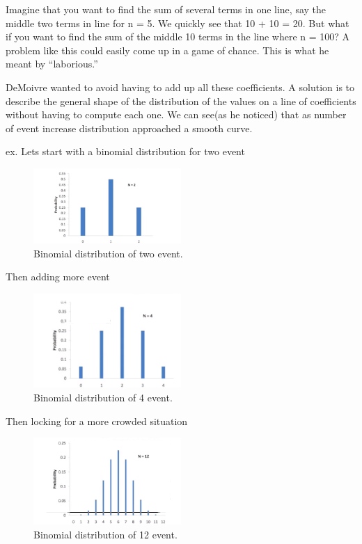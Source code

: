 \documentclass{article}
\begin{document}
Imagine that you want to find the sum of
several terms in one line, say the middle two
terms in line for n = 5.
We quickly see that 10 + 10 = 20.
But what if you want to find the sum of the middle
10 terms in the line where n = 100? A problem like
this could easily come up in a game of chance. This
is what he meant by “laborious.”

DeMoivre wanted to avoid having to add up all these coefficients. A solution is to describe the general shape of the distribution of the values on a line of coefficients without having to compute each one. We
can see(as he noticed) that as number of event increase distribution approached a smooth curve.

ex. Lets start with a binomial distribution for two event
\begin{figure}[H]
\centering
\includegraphics[width=0.5\textwidth]{images/0.png}
\caption{\label{fig:bin2}Binomial distribution of two event.}
\end{figure}

Then adding more event

\begin{figure}[H]
\centering
\includegraphics[width=0.5\textwidth]{images/1.png}
\caption{\label{fig:bin4}Binomial distribution of 4 event.}
\end{figure}
Then locking for a more crowded situation
\begin{figure}[H]
\centering
\includegraphics[width=0.5\textwidth]{images/2.png}
\caption{\label{fig:bin12}Binomial distribution of 12 event.}
\end{figure}
\end{document}
